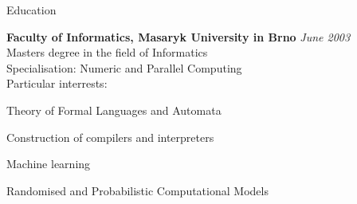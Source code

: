 \documentclass{resume} %
\begin{document}

\begin{rSection}{Education}

{\bf Faculty of Informatics, Masaryk University in Brno} \hfill {\em June 2003} \\ 
Masters degree in the field of Informatics \\
Specialisation: Numeric and Parallel Computing \\
Particular interrests:
\item Theory of Formal Languages and Automata
\item Construction of compilers and interpreters
\item Machine learning
\item Randomised and Probabilistic Computational Models

\end{rSection}

\end{document}
